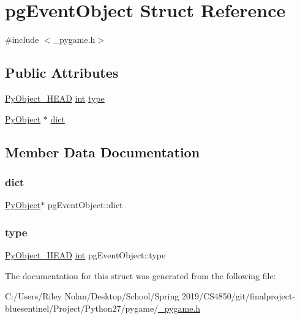 \hypertarget{structpg_event_object}{}\section{pg\+Event\+Object Struct Reference}
\label{structpg_event_object}


{\ttfamily \#include $<$\+\_\+pygame.\+h$>$}

\subsection*{Public Attributes}
\begin{DoxyCompactItemize}
\item 
\mbox{\hyperlink{_python27_2object_8h_a0bf35c1f3ea13f925de94d8593db3b7e}{Py\+Object\+\_\+\+H\+E\+AD}} \mbox{\hyperlink{warnings_8h_a74f207b5aa4ba51c3a2ad59b219a423b}{int}} \mbox{\hyperlink{structpg_event_object_a87a0a6659ba695ff73df992676e4d8eb}{type}}
\item 
\mbox{\hyperlink{_python27_2object_8h_aadc84ac7aed2cfa6f20c25f62bf3dac7}{Py\+Object}} $\ast$ \mbox{\hyperlink{structpg_event_object_af2238ce79dcc4bb5066447f4096d497b}{dict}}
\end{DoxyCompactItemize}


\subsection{Member Data Documentation}
\mbox{\label{structpg_event_object_af2238ce79dcc4bb5066447f4096d497b}} 
\subsubsection{\texorpdfstring{dict}{dict}}
{\footnotesize\ttfamily \mbox{\hyperlink{_python27_2object_8h_aadc84ac7aed2cfa6f20c25f62bf3dac7}{Py\+Object}}$\ast$ pg\+Event\+Object\+::dict}

\mbox{\label{structpg_event_object_a87a0a6659ba695ff73df992676e4d8eb}} 
\subsubsection{\texorpdfstring{type}{type}}
{\footnotesize\ttfamily \mbox{\hyperlink{_python27_2object_8h_a0bf35c1f3ea13f925de94d8593db3b7e}{Py\+Object\+\_\+\+H\+E\+AD}} \mbox{\hyperlink{warnings_8h_a74f207b5aa4ba51c3a2ad59b219a423b}{int}} pg\+Event\+Object\+::type}



The documentation for this struct was generated from the following file\+:\begin{DoxyCompactItemize}
\item 
C\+:/\+Users/\+Riley Nolan/\+Desktop/\+School/\+Spring 2019/\+C\+S4850/git/finalproject-\/bluesentinel/\+Project/\+Python27/pygame/\mbox{\hyperlink{__pygame_8h}{\+\_\+pygame.\+h}}\end{DoxyCompactItemize}
